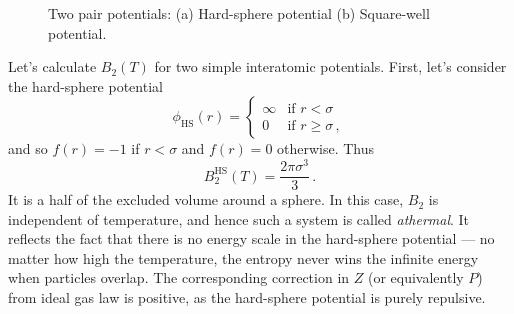 \documentclass{article}
\theoremstyle{plain}\theoremheaderfont{\normalfont\bfseries}\theorembodyfont{\rmfamily}\theoremseparator{.}\newtheorem*{thm}{Theorem}\newtheorem*{law}{Law}\newtheorem*{pos}{Postulate}
\numberwithin{equation}{section}
\begin{document}
    \begin{figure}
        \centering
        \caption{Two pair potentials: (a) Hard-sphere potential (b) Square-well potential.}
    \end{figure}

    Let's calculate \(B_2(T)\) for two simple interatomic potentials. First, let's consider the hard-sphere potential
    \begin{equation}
        \phi_{\text{HS}}(r)=\begin{cases}
            \infty & \text{if } r<\sigma \\
            0 & \text{if }r\ge \sigma\,,
        \end{cases}
    \end{equation}
    and so \(f(r)=-1\) if \(r<\sigma\) and \(f(r)=0\) otherwise. Thus
    \begin{equation}
        B_2^{\text{HS}}(T)=\frac{2\pi\sigma^3}{3}\,.
    \end{equation}
    It is a half of the excluded volume around a sphere. In this case, \(B_2\) is independent of temperature, and hence such a system is called \textit{athermal}. It reflects the fact that there is no energy scale in the hard-sphere potential --- no matter how high the temperature, the entropy never wins the infinite energy when particles overlap. The corresponding correction in \(Z\) (or equivalently \(P\)) from ideal gas law is positive, as the hard-sphere potential is purely repulsive.
\end{document}
